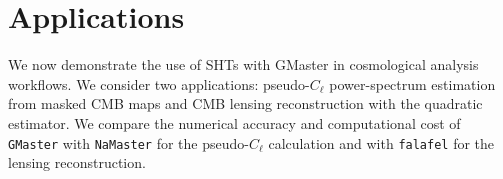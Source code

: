 \documentclass[letters,usenatbib,useAMS]{mnras}
\begin{document}
\section{Applications}
\label{sec:application}
We now demonstrate the use of SHTs with GMaster in cosmological analysis workflows. We consider two applications: pseudo-$C_\ell$ power-spectrum estimation from masked CMB maps and CMB lensing reconstruction with the quadratic estimator. We compare the numerical accuracy and computational cost of \texttt{GMaster} with \texttt{NaMaster} for the pseudo-$C_\ell$ calculation and with \texttt{falafel} for the lensing reconstruction.
\end{document}
